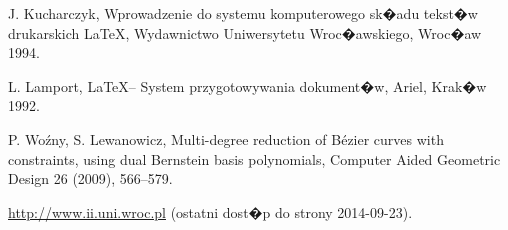 \documentclass[11pt,wide]{mwart}
\begin{document}
\begin{thebibliography}{9}
\itemsep2pt
 J. Kucharczyk, Wprowadzenie do systemu komputerowego
             sk�adu tekst�w drukarskich \LaTeX, Wydawnictwo Uniwersytetu
             Wroc�awskiego, Wroc�aw 1994.

 L. Lamport, \LaTeX -- System przygotowywania dokument�w,
             Ariel, Krak�w 1992.

  P. Wo\'zny,  S. Lewanowicz,  Multi-degree reduction of B\'ezier curves
		with constraints, using dual Bernstein basis polynomials,
		Computer Aided Geometric Design 26 (2009), 566--579.

 \url{http://www.ii.uni.wroc.pl}   (ostatni dost�p do strony 2014-09-23).

\end{thebibliography}
\end{document}
